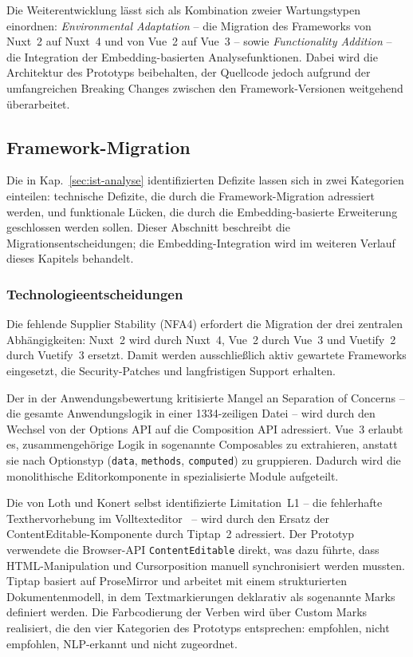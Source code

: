 Die Weiterentwicklung lässt sich als Kombination zweier Wartungstypen einordnen:
\emph{Environmental Adaptation} -- die Migration des Frameworks von Nuxt~2 auf Nuxt~4 und von Vue~2 auf Vue~3 -- sowie \emph{Functionality Addition} -- die Integration der Embedding-basierten Analysefunktionen.
Dabei wird die Architektur des Prototyps beibehalten, der Quellcode jedoch aufgrund der umfangreichen Breaking Changes zwischen den Framework-Versionen weitgehend überarbeitet.

\subsection{Framework-Migration}\label{sec:migration}

Die in Kap.~\ref{sec:ist-analyse} identifizierten Defizite lassen sich in zwei Kategorien einteilen: technische Defizite, die durch die Framework-Migration adressiert werden, und funktionale Lücken, die durch die Embedding-basierte Erweiterung geschlossen werden sollen.
Dieser Abschnitt beschreibt die Migrationsentscheidungen; die Embedding-Integration wird im weiteren Verlauf dieses Kapitels behandelt.

\subsubsection{Technologieentscheidungen}\label{sec:tech-entscheidungen}

Die fehlende Supplier Stability (NFA4) erfordert die Migration der drei zentralen Abhängigkeiten: Nuxt~2 wird durch Nuxt~4, Vue~2 durch Vue~3 und Vuetify~2 durch Vuetify~3 ersetzt.
Damit werden ausschließlich aktiv gewartete Frameworks eingesetzt, die Security-Patches und langfristigen Support erhalten.

Der in der Anwendungsbewertung kritisierte Mangel an Separation of Concerns -- die gesamte Anwendungslogik in einer 1334-zeiligen Datei -- wird durch den Wechsel von der Options API auf die Composition API adressiert.
Vue~3 erlaubt es, zusammengehörige Logik in sogenannte Composables zu extrahieren, anstatt sie nach Optionstyp (\texttt{data}, \texttt{methods}, \texttt{computed}) zu gruppieren.
Dadurch wird die monolithische Editorkomponente in spezialisierte Module aufgeteilt.

Die von Loth und Konert selbst identifizierte Limitation~L1 -- die fehlerhafte Texthervorhebung im Volltexteditor~\cite{loth2022kompetenzeditor} -- wird durch den Ersatz der ContentEditable-Komponente durch Tiptap~2 adressiert.
Der Prototyp verwendete die Browser-API \texttt{ContentEditable} direkt, was dazu führte, dass HTML-Manipulation und Cursorposition manuell synchronisiert werden mussten.
Tiptap basiert auf ProseMirror und arbeitet mit einem strukturierten Dokumentenmodell, in dem Textmarkierungen deklarativ als sogenannte Marks definiert werden.
Die Farbcodierung der Verben wird über Custom Marks realisiert, die den vier Kategorien des Prototyps entsprechen: empfohlen, nicht empfohlen, NLP-erkannt und nicht zugeordnet.


